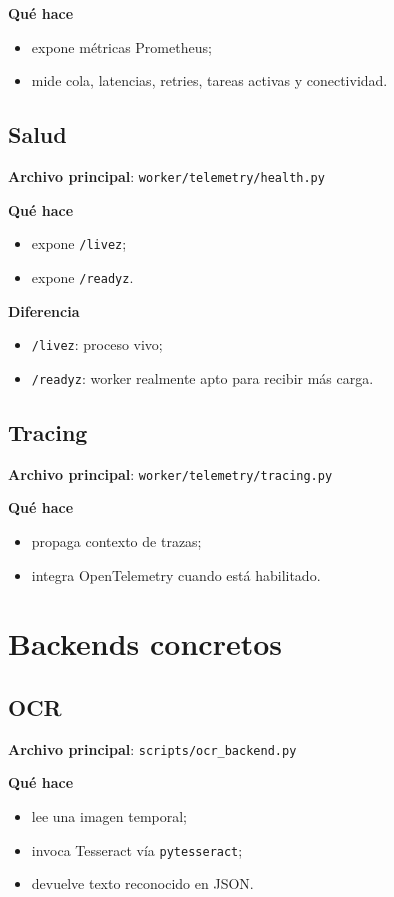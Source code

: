 \documentclass[11pt]{article}
\begin{document}
\textbf{Qué hace}
\begin{itemize}
\item expone métricas Prometheus;
\item mide cola, latencias, retries, tareas activas y conectividad.
\end{itemize}

\subsection{Salud}
\textbf{Archivo principal}: \texttt{worker/telemetry/health.py}

\textbf{Qué hace}
\begin{itemize}
\item expone \texttt{/livez};
\item expone \texttt{/readyz}.
\end{itemize}

\textbf{Diferencia}
\begin{itemize}
\item \texttt{/livez}: proceso vivo;
\item \texttt{/readyz}: worker realmente apto para recibir más carga.
\end{itemize}

\subsection{Tracing}
\textbf{Archivo principal}: \texttt{worker/telemetry/tracing.py}

\textbf{Qué hace}
\begin{itemize}
\item propaga contexto de trazas;
\item integra OpenTelemetry cuando está habilitado.
\end{itemize}

\section{Backends concretos}

\subsection{OCR}
\textbf{Archivo principal}: \texttt{scripts/ocr\_backend.py}

\textbf{Qué hace}
\begin{itemize}
\item lee una imagen temporal;
\item invoca Tesseract vía \texttt{pytesseract};
\item devuelve texto reconocido en JSON.
\end{itemize}
\end{document}
